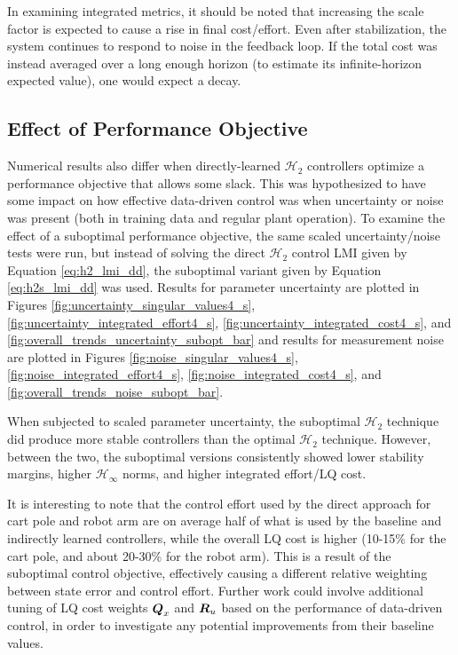 In examining integrated metrics, it should be noted that increasing the scale factor is expected to cause a rise in final cost/effort.  Even after stabilization, the system continues to respond to noise in the feedback loop.  If the total cost was instead averaged over a long enough horizon (to estimate its infinite-horizon expected value), one would expect a decay.

\subsection{Effect of Performance Objective}
Numerical results also differ when directly-learned $\mathcal{H}_{2}$ controllers optimize a performance objective that allows some slack.  This was hypothesized to have some impact on how effective data-driven control was when uncertainty or noise was present (both in training data and regular plant operation).  To examine the effect of a suboptimal performance objective, the same scaled uncertainty/noise tests were run, but instead of solving the direct $\mathcal{H}_{2}$ control LMI given by Equation \eqref{eq:h2_lmi_dd}, the suboptimal variant given by Equation \eqref{eq:h2s_lmi_dd} was used.  Results for parameter uncertainty are plotted in Figures \ref{fig:uncertainty_singular_values4_s}, \ref{fig:uncertainty_integrated_effort4_s}, \ref{fig:uncertainty_integrated_cost4_s}, and \ref{fig:overall_trends_uncertainty_subopt_bar} and results for measurement noise are plotted in Figures \ref{fig:noise_singular_values4_s}, \ref{fig:noise_integrated_effort4_s}, \ref{fig:noise_integrated_cost4_s}, and \ref{fig:overall_trends_noise_subopt_bar}.

When subjected to scaled parameter uncertainty, the suboptimal $\mathcal{H}_{2}$ technique did produce more stable controllers than the optimal $\mathcal{H}_{2}$ technique.  However, between the two, the suboptimal versions consistently showed lower stability margins, higher $\mathcal{H}_{\infty}$ norms, and higher integrated effort/LQ cost.

It is interesting to note that the control effort used by the direct approach for cart pole and robot arm are on average half of what is used by the baseline and indirectly learned controllers, while the overall LQ cost is higher (10-15\% for the cart pole, and about 20-30\% for the robot arm).  This is a result of the suboptimal control objective, effectively causing a different relative weighting between state error and control effort.  Further work could involve additional tuning of LQ cost weights $\vb*{Q}_{x}$ and $\vb*{R}_{u}$ based on the performance of data-driven control, in order to investigate any potential improvements from their baseline values.
